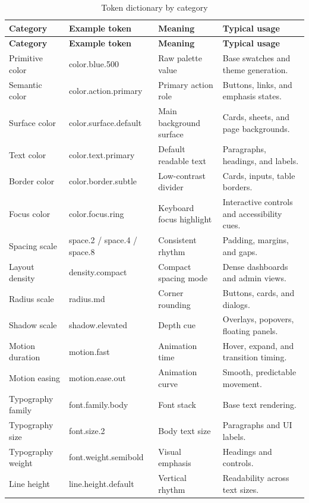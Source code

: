 \begin{longtable}{@{}p{}p{}p{}p{}@{}}
\caption{Token dictionary by category}\label{tab:token-dictionary}\\
\toprule
\textbf{Category} & \textbf{Example token} & \textbf{Meaning} & \textbf{Typical usage} \\
\midrule
\endfirsthead
\toprule
\textbf{Category} & \textbf{Example token} & \textbf{Meaning} & \textbf{Typical usage} \\
\midrule
\endhead
\bottomrule
\endfoot
Primitive color & color.blue.500 & Raw palette value & Base swatches and theme generation. \\
Semantic color & color.action.primary & Primary action role & Buttons, links, and emphasis states. \\
Surface color & color.surface.default & Main background surface & Cards, sheets, and page backgrounds. \\
Text color & color.text.primary & Default readable text & Paragraphs, headings, and labels. \\
Border color & color.border.subtle & Low-contrast divider & Cards, inputs, table borders. \\
Focus color & color.focus.ring & Keyboard focus highlight & Interactive controls and accessibility cues. \\
Spacing scale & space.2 / space.4 / space.8 & Consistent rhythm & Padding, margins, and gaps. \\
Layout density & density.compact & Compact spacing mode & Dense dashboards and admin views. \\
Radius scale & radius.md & Corner rounding & Buttons, cards, and dialogs. \\
Shadow scale & shadow.elevated & Depth cue & Overlays, popovers, floating panels. \\
Motion duration & motion.fast & Animation time & Hover, expand, and transition timing. \\
Motion easing & motion.ease.out & Animation curve & Smooth, predictable movement. \\
Typography family & font.family.body & Font stack & Base text rendering. \\
Typography size & font.size.2 & Body text size & Paragraphs and UI labels. \\
Typography weight & font.weight.semibold & Visual emphasis & Headings and controls. \\
Line height & line.height.default & Vertical rhythm & Readability across text sizes. \\

\end{longtable}
